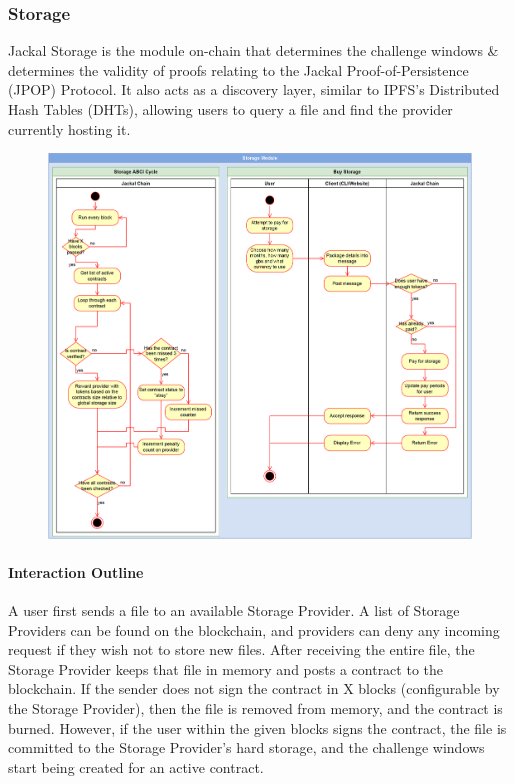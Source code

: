 \documentclass[a4paper]{article}
\begin{document}
\subsubsection{Storage}
Jackal Storage is the module on-chain that determines the challenge windows \& determines the validity of proofs relating to the Jackal Proof-of-Persistence (JPOP) Protocol. It also acts as a discovery layer, similar to IPFS's Distributed Hash Tables (DHTs), allowing users to query a file and find the provider currently hosting it. \cite{dht}
\begin{figure}[!htbp]
\centering
\includegraphics[width=1\textwidth]{assets/storage1.png}
\caption{}
\end{figure}

\paragraph{Interaction Outline}
A user first sends a file to an available Storage Provider. A list of Storage Providers can be found on the blockchain, and providers can deny any incoming request if they wish not to store new files. After receiving the entire file, the Storage Provider keeps that file in memory and posts a contract to the blockchain. If the sender does not sign the contract in X blocks (configurable by the Storage Provider), then the file is removed from memory, and the contract is burned. However, if the user within the given blocks signs the contract, the file is committed to the Storage Provider's hard storage, and the challenge windows start being created for an active contract.
\end{document}
